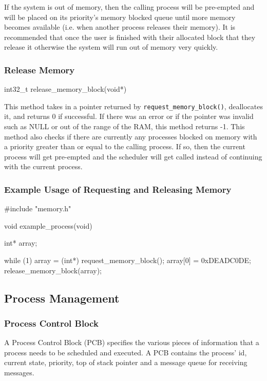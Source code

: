 \documentclass[se]{uw-wkrpt}
\begin{document}
If the system is out of memory, then the calling process will be pre-empted and will be placed on its priority's memory blocked queue until more memory becomes available (i.e. when another process releases their memory). It is recommended that once the user is finished with their allocated block that they release it otherwise the system will run out of memory very quickly.

\subsubsection{Release Memory}
\label{sec:release-memory-block}
\begin{code}
int32_t release_memory_block(void*)
\end{code}

This method takes in a pointer returned by \texttt{request\_memory\_block()}, deallocates it, and returns 0 if successful. If there was an error or if the pointer was invalid such as NULL or out of the range of the RAM, this method returns -1. This method also checks if there are currently any processes blocked on memory with a priority greater than or equal to the calling process. If so, then the current process will get pre-empted and the scheduler will get called instead of continuing with the current process.

\subsubsection{Example Usage of Requesting and Releasing Memory}
\begin{code}
#include "memory.h"

void example_process(void) {
    int* array;
    
    while (1) {
        array = (int*) request_memory_block();
        array[0] = 0xDEADC0DE;
        release_memory_block(array);
    }
}
\end{code}

\subsection{Process Management}

\subsubsection{Process Control Block}

A Process Control Block (PCB) specifies the various pieces of information that a process needs to be scheduled and executed. A PCB contains the process' id, current state, priority, top of stack pointer and a message queue for receiving messages.
\end{document}
